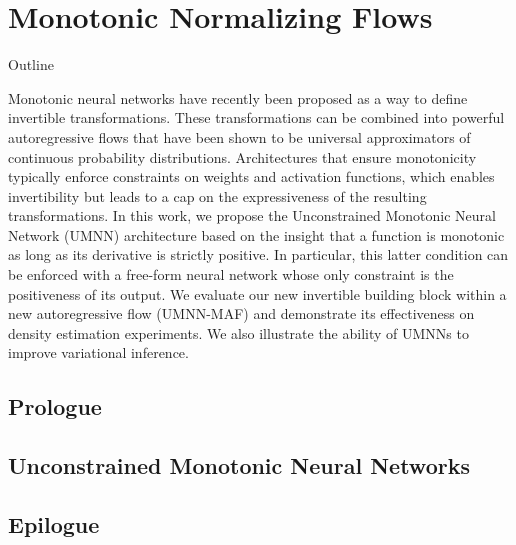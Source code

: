 \chapter{Monotonic Normalizing Flows}\label{ch:05}

\begin{remark}{Outline}

Monotonic neural networks have recently been proposed as a way to define invertible transformations.
These transformations can be combined into powerful autoregressive flows that have been shown to be universal approximators of continuous probability distributions.
Architectures that ensure monotonicity typically enforce constraints on weights and activation functions, which enables invertibility but leads to a cap on the expressiveness of the resulting transformations.
In this work, we propose the Unconstrained Monotonic Neural Network (UMNN) architecture based on the insight that a function is monotonic as long as its derivative is strictly positive. In particular, this latter condition can be enforced with a free-form neural network whose only constraint is the positiveness of its output.
We evaluate our new invertible building block within a new autoregressive flow (UMNN-MAF) and demonstrate its effectiveness on density estimation experiments.
We also illustrate the ability of UMNNs to improve variational inference.
\end{remark}

\section{Prologue}

\section{Unconstrained Monotonic Neural Networks}


\section{Epilogue}
